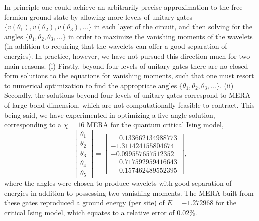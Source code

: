 \documentclass[aps,prl,twocolumn,showpacs,superscriptaddress,floatfix,10pt]{revtex4-1}
\begin{document}
In principle one could achieve an arbitrarily precise approximation to the free
fermion ground state by allowing more levels of unitary gates 
$\{v(\theta_1), v(\theta_2), v(\theta_3),\ldots \}$ in each layer of the circuit, and then
solving for the angles $\{\theta_1, \theta_2, \theta_3,\ldots\}$ in order to
maximize the vanishing moments of the wavelets (in addition to requiring that
the wavelets can offer a good separation of energies). In practice, however, we
have not pursued this direction much for two main reasons. (i) Firstly, beyond
four levels of unitary gates there are no closed form solutions to the
equations for vanishing moments, such that one must resort to numerical
optimization to find the appropriate angles 
$\{\theta_1, \theta_2, \theta_3,\ldots\}$. (ii) Secondly, the solutions beyond four levels of unitary
gates correspond to MERA of large bond dimension, which are not computationally
feasible to contract. This being said, we have experimented in optimizing a
five angle solution, corresponding to a $\chi=16$ MERA for the quantum critical
Ising model,
\begin{equation}
\left[ {\begin{array}{*{20}{l}}
  {{\theta _1}} \\ 
  {{\theta _2}} \\ 
  {{\theta _3}} \\ 
  {{\theta _4}} \\ 
  {{\theta _5}} 
\end{array}} \right] = \left[ {\begin{array}{*{20}{l}}
  {\phantom{-}0.133662134988773} \\ 
  { - 1.311424155804674} \\ 
  { - 0.099557657512352} \\ 
  {\phantom{-}0.717592959416643} \\ 
  {\phantom{-}0.157462489552395} 
\end{array}} \right], \label{eq:A5}
\end{equation}
where the angles were chosen to produce wavelets with good separation of
energies in addition to possessing two vanishing moments. The MERA built from
these gates reproduced a ground energy (per site) of $E = -1.272968$ for the
critical Ising model, which equates to a relative error of $0.02\%$.

\renewcommand\thefigure{C.\arabic{figure}}    
\renewcommand{\theequation}{C.\arabic{equation}}
\setcounter{figure}{0}  
\setcounter{equation}{0} 
\end{document}
